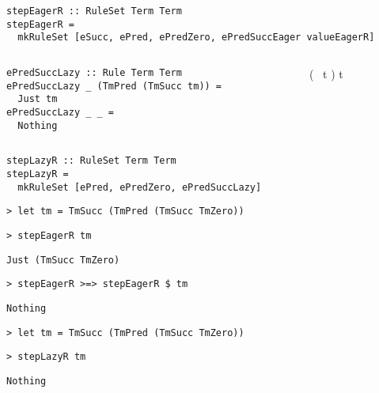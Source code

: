 \begin{frame}[fragile]
  \begin{verbatim}
stepEagerR :: RuleSet Term Term
stepEagerR =
  mkRuleSet [eSucc, ePred, ePredZero, ePredSuccEager valueEagerR]
  \end{verbatim}
\end{frame}

\begin{frame}[fragile]
  \begin{columns}
    \begin{column}{0.5\textwidth}
      \begin{verbatim}
ePredSuccLazy :: Rule Term Term
ePredSuccLazy _ (TmPred (TmSucc tm)) =
  Just tm
ePredSuccLazy _ _ =
  Nothing
      \end{verbatim}
    \end{column}
    \begin{column}{0.5\textwidth}
  \infrule[E-PredSucc]
          {}
          { ~ \left( ~t \right) \longrightarrow t}
    \end{column}
  \end{columns}
\end{frame}

\begin{frame}[fragile]
  \begin{verbatim}
stepLazyR :: RuleSet Term Term
stepLazyR =
  mkRuleSet [ePred, ePredZero, ePredSuccLazy]
  \end{verbatim}
\end{frame}

\begin{frame}[fragile]
  \onslide<+->
  \begin{verbatim}
> let tm = TmSucc (TmPred (TmSucc TmZero))
  \end{verbatim}
  \onslide<+->
  \begin{verbatim}
> stepEagerR tm
  \end{verbatim}
  \onslide<+->
  \begin{verbatim}
Just (TmSucc TmZero)
  \end{verbatim}
  \onslide<+->
  \begin{verbatim}
> stepEagerR >=> stepEagerR $ tm
  \end{verbatim}
  \onslide<+->
  \begin{verbatim}
Nothing
  \end{verbatim}
\end{frame}

\begin{frame}[fragile]
  \onslide<+->
  \begin{verbatim}
> let tm = TmSucc (TmPred (TmSucc TmZero))
  \end{verbatim}
  \onslide<+->
  \begin{verbatim}
> stepLazyR tm
  \end{verbatim}
  \onslide<+->
  \begin{verbatim}
Nothing
  \end{verbatim}
\end{frame}

